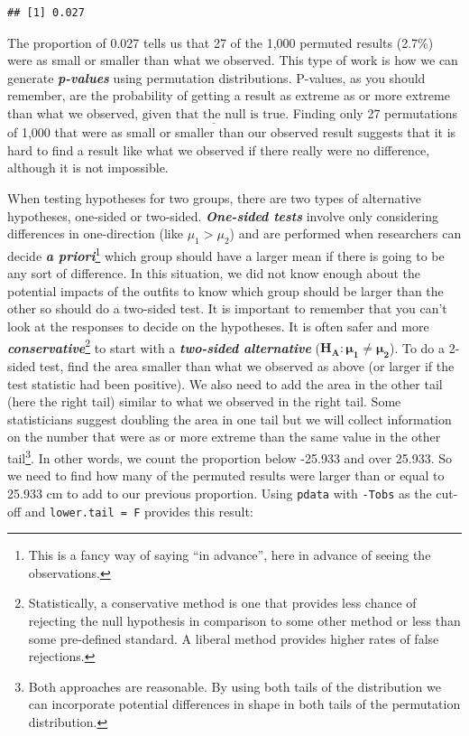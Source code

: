 \documentclass[
]{book}
\begin{document}
\begin{verbatim}
## [1] 0.027
\end{verbatim}

The proportion of 0.027 tells us that 27 of the 1,000 permuted results
(2.7\%) were as small or smaller than what we observed. This type of
work is how we can
generate \textbf{\emph{p-values}} using permutation distributions.
P-values,
as you should
remember, are the probability of getting a result as extreme as or more extreme
than what we observed, \(\underline{\text{given that the null is true}}\). Finding
only 27
permutations of 1,000 that were as small or smaller than our observed result suggests that it
is hard to find a result like what we observed if there really were no difference,
although it is not impossible.

\indent When testing hypotheses for two groups, there are two types of alternative
hypotheses, one-sided or two-sided. \textbf{\emph{One-sided tests}} involve only considering
differences in one-direction (like \(\mu_1 > \mu_2\)) and are performed when
researchers can decide \textbf{\emph{a priori}}\footnote{This is a fancy way of saying ``in advance'',
  here in advance of seeing the observations.} which group should have a larger mean
if there is going to be any sort of difference. In this situation, we did not
know enough about the potential impacts of the outfits to know which group should
be larger than the other so should do a two-sided test. It is important to
remember that you can't look at the responses to decide on the hypotheses. It is
often safer and more \textbf{\emph{conservative}}\footnote{Statistically, a conservative method is
  one that provides less chance of rejecting the null hypothesis in comparison to
  some other method or less than some pre-defined standard. A liberal method provides higher rates of false rejections.}   to start with a
\textbf{\emph{two-sided alternative}} (\(\mathbf{H_A: \mu_1 \ne \mu_2}\)). To do a 2-sided
test, find the area smaller than what we observed as above (or larger if the test statistic had been positive). We also need to add
the area in the other tail (here the right tail) similar to what we observed in the
right tail. Some statisticians suggest doubling the area in one tail but we will collect
information on the number that were as or more extreme than the same
value in the other
tail\footnote{Both approaches are reasonable. By using both tails of the distribution we can incorporate potential differences in shape in both tails of the permutation distribution.}. In other words, we count the proportion below -25.933 and over 25.933. So
we need to find how many of the permuted results were larger than or equal
to 25.933 cm
to add to our previous proportion. Using \texttt{pdata} with \texttt{-Tobs} as the cut-off
and \texttt{lower.tail\ =\ F} provides this result:
\end{document}
